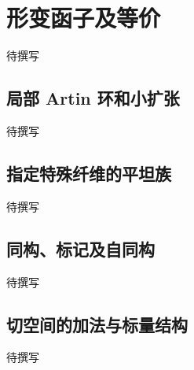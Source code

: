 
% 
% 

\section{形变函子及等价}
\label{g5:sec:3201}

待撰写

\subsection{局部 Artin 环和小扩张}
\label{g5:subsec:3201:01}
待撰写

\subsection{指定特殊纤维的平坦族}
\label{g5:subsec:3201:02}
待撰写

\subsection{同构、标记及自同构}
\label{g5:subsec:3201:03}
待撰写

\subsection{切空间的加法与标量结构}
\label{g5:subsec:3201:04}
待撰写
